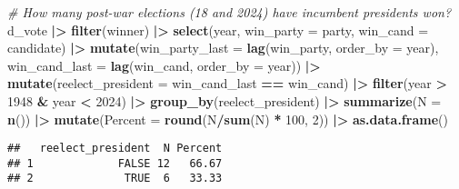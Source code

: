 \documentclass[
]{article}
\newenvironment{Shaded}{\begin{snugshade}}{\end{snugshade}}
\newcommand{\AttributeTok}[1]{\textcolor[rgb]{0.13,0.29,0.53}{#1}}
\newcommand{\CommentTok}[1]{\textcolor[rgb]{0.56,0.35,0.01}{\textit{#1}}}
\newcommand{\DecValTok}[1]{\textcolor[rgb]{0.00,0.00,0.81}{#1}}
\newcommand{\FunctionTok}[1]{\textcolor[rgb]{0.13,0.29,0.53}{\textbf{#1}}}
\newcommand{\NormalTok}[1]{#1}
\newcommand{\SpecialCharTok}[1]{\textcolor[rgb]{0.81,0.36,0.00}{\textbf{#1}}}
\begin{document}
\begin{Shaded}
\begin{Highlighting}[]
\CommentTok{\# How many post{-}war elections (18 and 2024) have incumbent presidents won? }
\NormalTok{d\_vote }\SpecialCharTok{|\textgreater{}} 
  \FunctionTok{filter}\NormalTok{(winner) }\SpecialCharTok{|\textgreater{}} 
  \FunctionTok{select}\NormalTok{(year, }\AttributeTok{win\_party =}\NormalTok{ party, }\AttributeTok{win\_cand =}\NormalTok{ candidate) }\SpecialCharTok{|\textgreater{}} 
  \FunctionTok{mutate}\NormalTok{(}\AttributeTok{win\_party\_last =} \FunctionTok{lag}\NormalTok{(win\_party, }\AttributeTok{order\_by =}\NormalTok{ year),}
         \AttributeTok{win\_cand\_last =} \FunctionTok{lag}\NormalTok{(win\_cand, }\AttributeTok{order\_by =}\NormalTok{ year)) }\SpecialCharTok{|\textgreater{}} 
  \FunctionTok{mutate}\NormalTok{(}\AttributeTok{reelect\_president =}\NormalTok{ win\_cand\_last }\SpecialCharTok{==}\NormalTok{ win\_cand) }\SpecialCharTok{|\textgreater{}} 
  \FunctionTok{filter}\NormalTok{(year }\SpecialCharTok{\textgreater{}} \DecValTok{1948} \SpecialCharTok{\&}\NormalTok{ year }\SpecialCharTok{\textless{}} \DecValTok{2024}\NormalTok{) }\SpecialCharTok{|\textgreater{}} 
  \FunctionTok{group\_by}\NormalTok{(reelect\_president) }\SpecialCharTok{|\textgreater{}} 
  \FunctionTok{summarize}\NormalTok{(}\AttributeTok{N =} \FunctionTok{n}\NormalTok{()) }\SpecialCharTok{|\textgreater{}} 
  \FunctionTok{mutate}\NormalTok{(}\AttributeTok{Percent =} \FunctionTok{round}\NormalTok{(N}\SpecialCharTok{/}\FunctionTok{sum}\NormalTok{(N) }\SpecialCharTok{*} \DecValTok{100}\NormalTok{, }\DecValTok{2}\NormalTok{)) }\SpecialCharTok{|\textgreater{}}
  \FunctionTok{as.data.frame}\NormalTok{()}
\end{Highlighting}
\end{Shaded}

\begin{verbatim}
##   reelect_president  N Percent
## 1             FALSE 12   66.67
## 2              TRUE  6   33.33
\end{verbatim}
\end{document}
